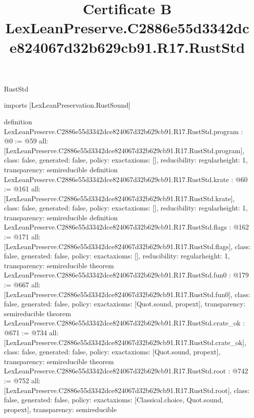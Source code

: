 \begin{lexlean}{RustStd}
\title{Certificate B LexLeanPreserve.C2886e55d3342dce824067d32b629cb91.R17.RustStd}
\begin{coremodule}
imports [LexLeanPreservation.RustSound]

definition LexLeanPreserve.C2886e55d3342dce824067d32b629cb91.R17.RustStd.program : @0 := @59 {
  all: [LexLeanPreserve.C2886e55d3342dce824067d32b629cb91.R17.RustStd.program],
  class: false,
  generated: false,
  policy: exact{axioms: []},
  reducibility: regular{height: 1},
  transparency: semireducible
}
definition LexLeanPreserve.C2886e55d3342dce824067d32b629cb91.R17.RustStd.krate : @60 := @161 {
  all: [LexLeanPreserve.C2886e55d3342dce824067d32b629cb91.R17.RustStd.krate],
  class: false,
  generated: false,
  policy: exact{axioms: []},
  reducibility: regular{height: 1},
  transparency: semireducible
}
definition LexLeanPreserve.C2886e55d3342dce824067d32b629cb91.R17.RustStd.flags : @162 := @171 {
  all: [LexLeanPreserve.C2886e55d3342dce824067d32b629cb91.R17.RustStd.flags],
  class: false,
  generated: false,
  policy: exact{axioms: []},
  reducibility: regular{height: 1},
  transparency: semireducible
}
theorem LexLeanPreserve.C2886e55d3342dce824067d32b629cb91.R17.RustStd.fun0 : @179 := @667 {
  all: [LexLeanPreserve.C2886e55d3342dce824067d32b629cb91.R17.RustStd.fun0],
  class: false,
  generated: false,
  policy: exact{axioms: [Quot.sound, propext]},
  transparency: semireducible
}
theorem LexLeanPreserve.C2886e55d3342dce824067d32b629cb91.R17.RustStd.crate_ok : @671 := @734 {
  all: [LexLeanPreserve.C2886e55d3342dce824067d32b629cb91.R17.RustStd.crate_ok],
  class: false,
  generated: false,
  policy: exact{axioms: [Quot.sound, propext]},
  transparency: semireducible
}
theorem LexLeanPreserve.C2886e55d3342dce824067d32b629cb91.R17.RustStd.root : @742 := @752 {
  all: [LexLeanPreserve.C2886e55d3342dce824067d32b629cb91.R17.RustStd.root],
  class: false,
  generated: false,
  policy: exact{axioms: [Classical.choice, Quot.sound, propext]},
  transparency: semireducible
}


\end{coremodule}
\end{lexlean}
